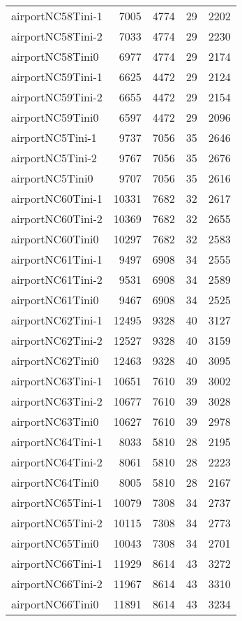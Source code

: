 \begin{longtable}{lrrrr}
airportNC58Tini-1 & 7005 & 4774 & 29 & 2202 \\
airportNC58Tini-2 & 7033 & 4774 & 29 & 2230 \\
airportNC58Tini0 & 6977 & 4774 & 29 & 2174 \\
airportNC59Tini-1 & 6625 & 4472 & 29 & 2124 \\
airportNC59Tini-2 & 6655 & 4472 & 29 & 2154 \\
airportNC59Tini0 & 6597 & 4472 & 29 & 2096 \\
airportNC5Tini-1 & 9737 & 7056 & 35 & 2646 \\
airportNC5Tini-2 & 9767 & 7056 & 35 & 2676 \\
airportNC5Tini0 & 9707 & 7056 & 35 & 2616 \\
airportNC60Tini-1 & 10331 & 7682 & 32 & 2617 \\
airportNC60Tini-2 & 10369 & 7682 & 32 & 2655 \\
airportNC60Tini0 & 10297 & 7682 & 32 & 2583 \\
airportNC61Tini-1 & 9497 & 6908 & 34 & 2555 \\
airportNC61Tini-2 & 9531 & 6908 & 34 & 2589 \\
airportNC61Tini0 & 9467 & 6908 & 34 & 2525 \\
airportNC62Tini-1 & 12495 & 9328 & 40 & 3127 \\
airportNC62Tini-2 & 12527 & 9328 & 40 & 3159 \\
airportNC62Tini0 & 12463 & 9328 & 40 & 3095 \\
airportNC63Tini-1 & 10651 & 7610 & 39 & 3002 \\
airportNC63Tini-2 & 10677 & 7610 & 39 & 3028 \\
airportNC63Tini0 & 10627 & 7610 & 39 & 2978 \\
airportNC64Tini-1 & 8033 & 5810 & 28 & 2195 \\
airportNC64Tini-2 & 8061 & 5810 & 28 & 2223 \\
airportNC64Tini0 & 8005 & 5810 & 28 & 2167 \\
airportNC65Tini-1 & 10079 & 7308 & 34 & 2737 \\
airportNC65Tini-2 & 10115 & 7308 & 34 & 2773 \\
airportNC65Tini0 & 10043 & 7308 & 34 & 2701 \\
airportNC66Tini-1 & 11929 & 8614 & 43 & 3272 \\
airportNC66Tini-2 & 11967 & 8614 & 43 & 3310 \\
airportNC66Tini0 & 11891 & 8614 & 43 & 3234 \\

\end{longtable}
